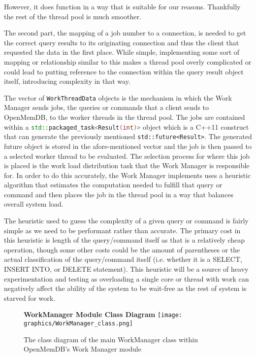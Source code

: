 \documentclass[letterpaper, 12pt]{article}
\begin{document}
  However, it does function in a way that is suitable for our reasons. Thankfully the rest of the thread
  pool is much smoother.
  \par\vspace{\baselineskip}
  The second part, the mapping of a job number to a connection, is needed to get the correct query results
  to its originating connection and thus the client that requested the data in the first place. While simple, 
  implementing some sort of mapping or relationship similar to this makes a thread pool overly complicated
  or could lead to putting reference to the connection within the query result object itself, introducing
  complexity in that way.
  \par\vspace{\baselineskip}
  The vector of \lstinline[]|WorkThreadData| objects is the mechanism in 
  which the Work Manager sends jobs, the queries or commands that a client sends to OpenMemDB, to the 
  worker threads in the thread pool. The jobs are contained within a \lstinline[language=C++]|std::packaged_task<Result(int)>|
  object which is a C++11 construct that can generate the previously mentioned \lstinline|std::future<Result>|.
  The generated future object is stored in the afore-mentioned vector and the job is then passed to a selected
  worker thread to be evaluated. The selection process for where this job is placed is the work load distribution
  task that the Work Manager is responsible for. In order to do this accurately, the Work Manager implements
  uses a heuristic algorithm that estimates the computation needed to fulfill that query or command
  and then places the job in the thread pool in a way that balances overall system load.
  \par\vspace{\baselineskip}
  The heuristic used to guess the complexity of a given query or command is fairly simple as we need to
  be performant rather than accurate. The primary cost in this heuristic is length of the query/command itself
  as that is a relatively cheap operation, though some other costs could be the amount of parentheses
  or the actual classification of the query/command itself (i.e. whether it is a SELECT, INSERT INTO, or DELETE statement).
  This heuristic will be a source of heavy experimentation and testing as overloading a single core or thread
  with work can negatively affect the ability of the system to be wait-free as the rest of system is 
  starved for work.
  \par\vspace{\baselineskip}
  \begin{figure}
   \centering
   \textbf{WorkManager Module Class Diagram}
   \texttt{[image: graphics/WorkManager\_class.png]}
   \caption{The class diagram of the main WorkManager class within OpenMemDB's Work Manager module}
  \end{figure}
  
\end{document}
